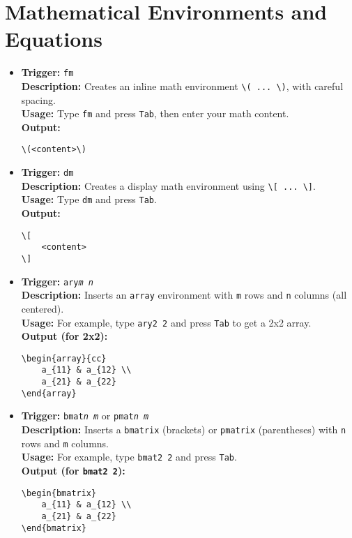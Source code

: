 \documentclass{article}
\begin{document}
\section{Mathematical Environments and Equations}
\begin{itemize}[leftmargin=*, label={}]
\item \textbf{Trigger:} \texttt{fm} \\
\textbf{Description:} Creates an inline math environment \verb|\( ... \)|, with careful spacing. \\
\textbf{Usage:} Type \texttt{fm} and press \texttt{Tab}, then enter your math content. \\
\textbf{Output:}
\begin{verbatim}
\(<content>\)
\end{verbatim}

\item \textbf{Trigger:} \texttt{dm} \\
\textbf{Description:} Creates a display math environment using \verb|\[ ... \]|. \\
\textbf{Usage:} Type \texttt{dm} and press \texttt{Tab}. \\
\textbf{Output:}
\begin{verbatim}
\[
    <content>
\]
\end{verbatim}

\item \textbf{Trigger:} \texttt{ary\textit{m} \textit{n}} \\
\textbf{Description:} Inserts an \verb|array| environment with \texttt{m} rows and \texttt{n} columns (all centered). \\
\textbf{Usage:} For example, type \texttt{ary2 2} and press \texttt{Tab} to get a 2x2 array. \\
\textbf{Output (for 2x2):}
\begin{verbatim}
\begin{array}{cc}
    a_{11} & a_{12} \\
    a_{21} & a_{22}
\end{array}
\end{verbatim}

\item \textbf{Trigger:} \texttt{bmat\textit{n} \textit{m}} or \texttt{pmat\textit{n} \textit{m}} \\
\textbf{Description:} Inserts a \texttt{bmatrix} (brackets) or \texttt{pmatrix} (parentheses) with \texttt{n} rows and \texttt{m} columns. \\
\textbf{Usage:} For example, type \texttt{bmat2 2} and press \texttt{Tab}. \\
\textbf{Output (for \texttt{bmat2 2}):}
\begin{verbatim}
\begin{bmatrix}
    a_{11} & a_{12} \\
    a_{21} & a_{22}
\end{bmatrix}
\end{verbatim}


\end{itemize}
\end{document}
